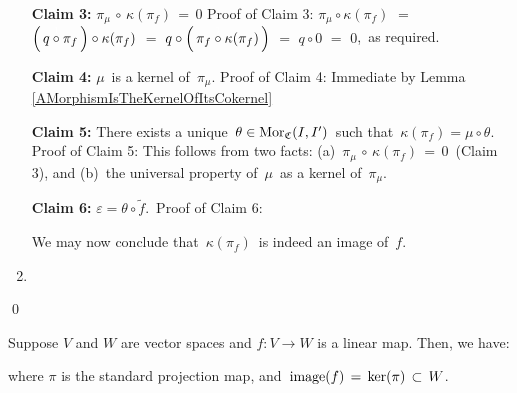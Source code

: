 \begin{enumerate}
	\vskip 0.3cm
	\noindent
	\textbf{Claim 3:}\;\; $\pi_{\mu} \,\circ\, \kappa(\pi_{f}) \,=\, 0$
	\vskip -0.1cm
	\noindent
	Proof of Claim 3:\;
	$\pi_{\mu} \circ \kappa(\pi_{f})$
	\;$=$\; $\left(\, q \overset{{\color{white}1}}{\circ} \pi_{f} \,\right) \circ \kappa(\pi_{f})$
	\;$=$\; $q \circ \left(\, \pi_{f} \overset{{\color{white}1}}{\circ} \kappa(\pi_{f}) \,\right)$
	\;$=$\; $q \circ 0$
	\;$=$\; $0$,\,
	as required.

	\vskip 0.3cm
	\noindent
	\textbf{Claim 4:}\;\; $\mu$\, is a kernel of \,$\pi_{\mu}$.
	\vskip -0.1cm
	\noindent
	Proof of Claim 4:\; Immediate by Lemma \ref{AMorphismIsTheKernelOfItsCokernel}

	\vskip 0.3cm
	\noindent
	\textbf{Claim 5:}\;\; There exists a unique \,$\theta \in \textnormal{Mor}_{\mathfrak{C}}(I,I^{\prime})$\,
	such that \,$\kappa(\pi_{f}) = \mu \circ \theta$.\,
	\vskip 0.05cm
	\noindent
	Proof of Claim 5:\;
	This follows from two facts:\;
	(a)	\,$\pi_{\mu} \,\circ\, \kappa(\pi_{f}) \,=\, 0$\, (Claim 3), and
	(b)	\,the universal property of \,$\mu$\, as a kernel of \,$\pi_{\mu}$.
	
	\vskip 0.3cm
	\noindent
	\textbf{Claim 6:}\;\; $\varepsilon = \theta \circ \widetilde{f}$.\,
	\vskip 0.05cm
	\noindent
	Proof of Claim 6:\;

	\vskip 0.3cm
	\noindent
	We may now conclude that \,$\kappa(\pi_{f})$\, is indeed an image of \,$f$.
\item
\end{enumerate}
\qed


\vskip 0.5cm
\begin{remark}
\mbox{}
\vskip 0.15cm
\noindent
Suppose $V$ and $W$ are vector spaces and $f : V \longrightarrow W$ is a linear map.
Then, we have:
\begin{center}
\end{center}
where $\pi$ is the standard projection map, and
\,$\textnormal{image}(f) \,=\, \ker(\pi) \,\subset\, W$.
\end{remark}

